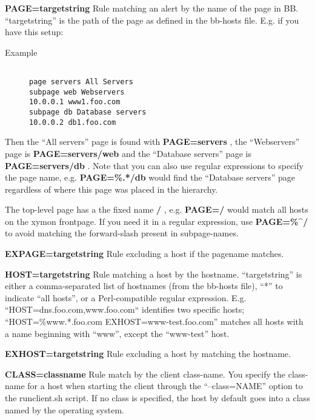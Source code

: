  \textbf{PAGE=targetstring}
 Rule matching an alert by the name of the page in
 BB. ``targetstring'' is the path of the page as defined in the
 bb-hosts file. E.g. if you have this setup: 

\begin{description}

\item[Example]
\begin{verbatim}

page servers All Servers
subpage web Webservers
10.0.0.1 www1.foo.com
subpage db Database servers
10.0.0.2 db1.foo.com

\end{verbatim}


\end{description}



  Then the ``All servers'' page is found with \textbf{PAGE=servers}
, the ``Webservers'' page is \textbf{PAGE=servers/web}
 and the ``Database servers'' page is \textbf{PAGE=servers/db}
. Note that you can also use regular expressions to specify the page name, e.g. \textbf{PAGE=\%.*/db}
 would find the ``Database servers'' page regardless of where this page was placed in the hierarchy. 


  The top-level page has a the fixed name \textbf{/}
, e.g. \textbf{PAGE=/} would match all hosts on the xymon
  frontpage. If you need it in a regular expression, use
  \textbf{PAGE=\%\^{}/} to avoid matching the forward-slash present in
  subpage-names. 



 \textbf{EXPAGE=targetstring}
 Rule excluding a host if the pagename matches. 


 \textbf{HOST=targetstring}
 Rule matching a host by the hostname. ``targetstring'' is either a
 comma-separated list of hostnames (from the bb-hosts file), ``*'' to
 indicate ``all hosts'', or a Perl-compatible regular
 expression. E.g. ``HOST=dns.foo.com,www.foo.com`` identifies two
 specific hosts; ``HOST=\%www.*.foo.com EXHOST=www-test.foo.com''
 matches all hosts with a name beginning with ``www'', except the
 ``www-test'' host. 



 \textbf{EXHOST=targetstring}
 Rule excluding a host by matching the hostname. 


 \textbf{CLASS=classname}
 Rule match by the client class-name. You specify the class-name for a
 host when starting the client through the ``--class=NAME'' option to
 the runclient.sh script. If no class is specified, the host by
 default goes into a class named by the operating system. 



